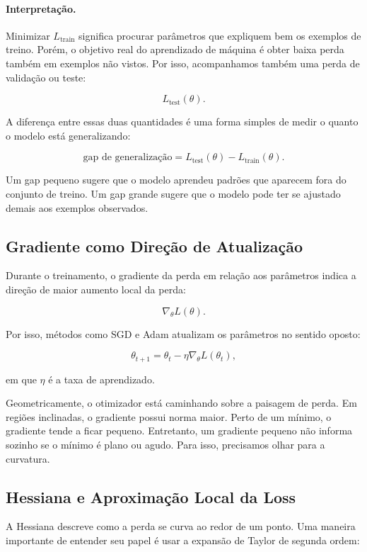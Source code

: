 \documentclass[12pt, a4paper]{article}
\begin{document}
\paragraph{Interpretação.}

Minimizar \(L_{\text{train}}\) significa procurar parâmetros que expliquem bem
os exemplos de treino. Porém, o objetivo real do aprendizado de máquina é obter
baixa perda também em exemplos não vistos. Por isso, acompanhamos também uma
perda de validação ou teste:

\[
L_{\text{test}}(\theta).
\]

A diferença entre essas duas quantidades é uma forma simples de medir o
quanto o modelo está generalizando:

\[
\text{gap de generalização}
=
L_{\text{test}}(\theta)
-
L_{\text{train}}(\theta).
\]

Um gap pequeno sugere que o modelo aprendeu padrões que aparecem fora do
conjunto de treino. Um gap grande sugere que o modelo pode ter se ajustado
demais aos exemplos observados.

\subsection{Gradiente como Direção de Atualização}

Durante o treinamento, o gradiente da perda em relação aos parâmetros indica a
direção de maior aumento local da perda:

\[
\nabla_{\theta} L(\theta).
\]

Por isso, métodos como SGD e Adam atualizam os parâmetros no sentido oposto:

\[
\theta_{t+1}
=
\theta_t
-
\eta \nabla_{\theta} L(\theta_t),
\]

em que \(\eta\) é a taxa de aprendizado.

Geometricamente, o otimizador está caminhando sobre a paisagem de perda. Em
regiões inclinadas, o gradiente possui norma maior. Perto de um mínimo, o
gradiente tende a ficar pequeno. Entretanto, um gradiente pequeno não informa
sozinho se o mínimo é plano ou agudo. Para isso, precisamos olhar para a
curvatura.

\subsection{Hessiana e Aproximação Local da Loss}

A Hessiana descreve como a perda se curva ao redor de um ponto. Uma maneira
importante de entender seu papel é usar a expansão de Taylor de segunda ordem:
\end{document}
